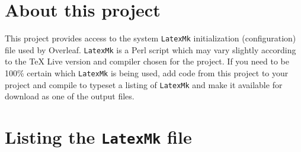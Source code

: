 \documentclass[a4paper]{article}
\begin{document}
\section*{About this project}
This project provides access to the system \texttt{LatexMk} initialization (configuration) file used by Overleaf.  \texttt{LatexMk} is a Perl script which may vary slightly according to the \TeX{} Live version and compiler chosen for the project. If you need to be 100\% certain which  \texttt{LatexMk} is being used, add code from this project to your project and compile to typeset a listing of \texttt{LatexMk} and make it available for download as one of the output files.
\section*{Listing the \texttt{LatexMk} file}

\end{document}
